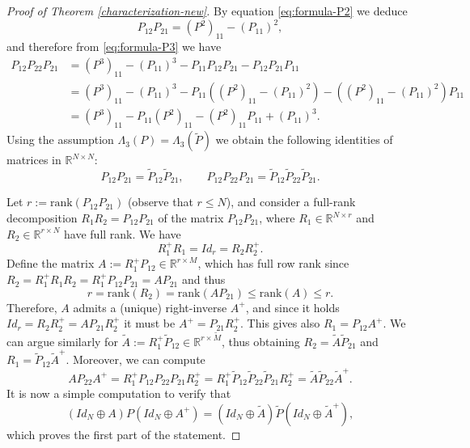 \documentclass[a4paper,11pt,oneside]{amsart}
\newcommand{\R}{{\mathbb R}}
\begin{document}
\begin{proof}[Proof of Theorem \ref{characterization-new}]
By equation \eqref{eq:formula-P2} we deduce $$ P_{12}P_{21} = (P^2)_{11}-(P_{11})^2, $$
and therefore from \eqref{eq:formula-P3} we have
\begin{align*}
    P_{12}P_{22}P_{21} & = (P^3)_{11} - (P_{11})^3 - P_{11}P_{12}P_{21} - P_{12}P_{21}P_{11} 
    \\ & = 
    (P^3)_{11} - (P_{11})^3 - P_{11}((P^2)_{11}-(P_{11})^2) - ((P^2)_{11}-(P_{11})^2)P_{11}
     \\ & = 
    (P^3)_{11} - P_{11}(P^2)_{11} - (P^2)_{11}P_{11}+(P_{11})^3.
\end{align*} 
Using the assumption $\Lambda_3(P)=\Lambda_3(\tilde P)$ we obtain the following identities of matrices in $\R^{N\times N}$:
$$ P_{12}P_{21} =  \tilde P_{12}\tilde P_{21}, \qquad  P_{12}P_{22}P_{21} =  \tilde P_{12}\tilde P_{22}\tilde P_{21}.  $$

Let $r:= \mbox{rank}( P_{12}P_{21} )$ (observe that $r\leq N$), and consider a full-rank decomposition $R_1R_2 = P_{12}P_{21}$ of the matrix $P_{12}P_{21}$, where $R_1\in \R^{N\times r}$ and $R_2\in \R^{r\times N}$ have full rank. We have  $$R_1^+R_1 = Id_r = R_2R_2^+.$$ Define the matrix $A:= R_1^+P_{12}\in\R^{r\times M}$, which has full row rank since $R_2 =R_1^+R_1R_2 = R_1^+P_{12}P_{21} = AP_{21}$ and thus
$$ r= \mbox{rank}(R_2) = \mbox{rank}(AP_{21}) \leq \mbox{rank}(A) \leq r. $$
Therefore, $A$ admits a (unique) right-inverse $A^+$, and since it holds $Id_r = R_2R_2^+ = AP_{21}R_2^+$ it must be $A^+ = P_{21}R_2^+$. This gives also $R_1 = P_{12}A^+$. We can argue similarly for $\tilde A:= R_1^+\tilde P_{12}\in \R^{r\times \tilde M}$, thus obtaining $R_2 = \tilde A\tilde P_{21}$ and $R_1 = \tilde P_{12}\tilde A^+$. Moreover, we can compute
$$  AP_{22}A^+= R_1^+ P_{12}P_{22}P_{21} R_2^+ =  R_1^+ \tilde P_{12}\tilde P_{22}\tilde P_{21} R_2^+ = \tilde A\tilde P_{22}\tilde A^+. $$
It is now a simple computation to verify that
$$(Id_N\oplus A) P (Id_N\oplus A^+) = (Id_N\oplus \tilde A) \tilde P (Id_N\oplus \tilde A^+),$$
which proves the first part of the statement.


\end{proof}
\end{document}
